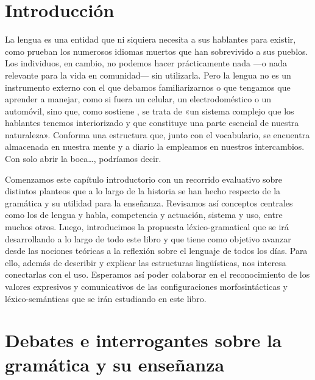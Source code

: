 
\section{Introducción}

La lengua es una entidad que ni siquiera necesita a sus hablantes para existir,
como prueban los numerosos idiomas muertos que han sobrevivido a sus pueblos.
Los individuos, en cambio, no podemos hacer prácticamente nada ---o nada
relevante para la vida en comunidad--- sin utilizarla. Pero la lengua no es un
instrumento externo con el que debamos familiarizarnos o que tengamos que
aprender a manejar, como si fuera un celular, un electrodoméstico o un
automóvil, sino que, como sostiene \textcite[18]{bosque2018}, se trata de «un
sistema complejo que los hablantes tenemos interiorizado y que constituye una
parte esencial de nuestra naturaleza». Conforma una estructura que, junto con
el vocabulario, se encuentra almacenada en nuestra mente y a diario la
empleamos en nuestros intercambios. Con solo abrir la boca\ldots, podríamos
decir.

Comenzamos este capítulo introductorio con un recorrido evaluativo sobre
distintos planteos que a lo largo de la historia se han hecho respecto de la
gramática y su utilidad para la enseñanza. Revisamos así conceptos centrales
como los de lengua y habla, competencia y actuación, sistema y uso, entre
muchos otros. Luego, introducimos la propuesta léxico-gramatical que se irá
desarrollando a lo largo de todo este libro y que tiene como objetivo avanzar
desde las nociones teóricas a la reflexión sobre el lenguaje de todos los días.
Para ello, además de describir y explicar las estructuras lingüísticas, nos
interesa conectarlas con el uso. Esperamos así poder colaborar en el
reconocimiento de los valores expresivos y comunicativos de las configuraciones
morfosintácticas y léxico-semánticas que se irán estudiando en este libro.

\section{Debates e interrogantes sobre la gramática y su enseñanza}

